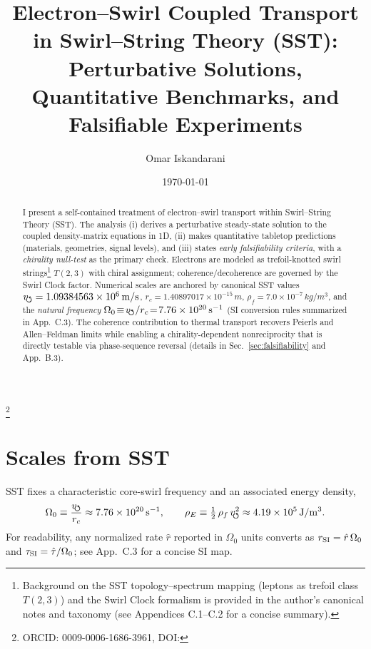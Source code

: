 \documentclass[aps,prb,preprint,amsmath,amssymb]{revtex4-2} %
\newcommand{\vswirlVal}{1.09384563\times10^{6}} %
\newcommand{\rcVal}{1.40897017\times10^{-15}} %
\newcommand{\rhoFVal}{7.0\times10^{-7}} %
\newcommand{\vswirl}{v_{\!\mkern-2mu\scriptstyle\boldsymbol{\circlearrowleft}}}
\newcommand{\rc}{r_c}
\newcommand{\rhoF}{\rho_{f}}
\newcommand{\rhoE}{\rho_{E}}
\begin{document}
    \title{Electron--Swirl Coupled Transport in Swirl--String Theory (SST):\\
    Perturbative Solutions, Quantitative Benchmarks, and Falsifiable Experiments}

    \author{Omar Iskandarani}
    \thanks{ORCID: 0009-0006-1686-3961, DOI: \paperdoi}
    \date{\today}

    \begin{abstract}
        I present a self-contained treatment of electron–swirl transport within Swirl–String Theory (SST). The analysis (i) derives a perturbative steady-state solution to the coupled density-matrix equations in 1D, (ii) makes quantitative tabletop predictions (materials, geometries, signal levels), and (iii) states \emph{early falsifiability criteria}, with a \emph{chirality null-test} as the primary check. Electrons are modeled as trefoil-knotted swirl strings\footnote{Background on the SST topology–spectrum mapping (leptons as trefoil class $T(2,3)$) and the Swirl Clock formalism is provided in the author’s canonical notes and taxonomy (see Appendices C.1–C.2 for a concise summary).} $T(2,3)$ with chiral assignment; coherence/decoherence are governed by the Swirl Clock factor. Numerical scales are anchored by canonical SST values $\vswirl=\vswirlVal\,\si{m/s}$, $\rc=\rcVal\,\si{m}$, $\rhoF=\rhoFVal\,\si{kg/m^3}$, and the \emph{natural frequency} $\Omega_0\!\equiv\!\vswirl/\rc\!=\!7.76\times10^{20}\,\si{s^{-1}}$ (SI conversion rules summarized in App.~C.3). The coherence contribution to thermal transport recovers Peierls and Allen–Feldman limits while enabling a chirality-dependent nonreciprocity that is directly testable via phase-sequence reversal (details in Sec.~\ref{sec:falsifiability} and App.~B.3).
    \end{abstract}

    \maketitle

    \section{Scales from SST}
        SST fixes a characteristic core-swirl frequency and an associated energy density,
        \begin{align}
            \Omega_0 \equiv \frac{\vswirl}{\rc} \approx 7.76\times10^{20}\,\si{s^{-1}},\qquad
            \rhoE \equiv \tfrac12\,\rhoF\,\vswirl^2 \approx 4.19\times10^{5}\,\si{J/m^3}.
        \end{align}
        For readability, any normalized rate $\hat r$ reported in $\Omega_0$ units converts as $r_{\rm SI}=\hat r\,\Omega_0$ and $\tau_{\rm SI}=\hat \tau/\Omega_0$; see App.~C.3 for a concise SI map.
\end{document}
